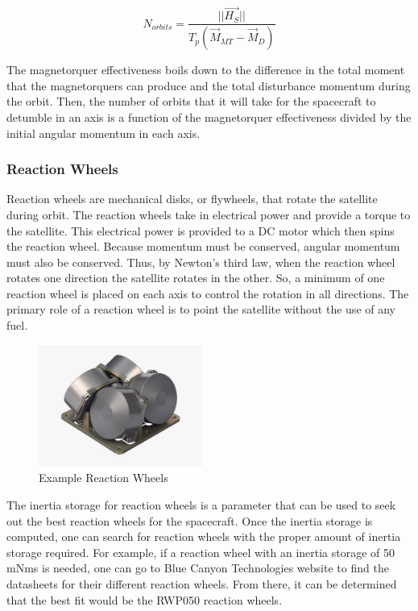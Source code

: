 \begin{equation}
  N_{orbits} = \frac{||\vec{H_S}||}{T_p(\vec{M}_{MT}-\vec{M}_D)}
\end{equation}

The magnetorquer effectiveness boils down to the difference in the
total moment that the magnetorquers can produce and the total
disturbance momentum during the orbit. Then, the number of orbits that
it will take for the spacecraft to detumble in an axis is a function
of the magnetorquer effectiveness divided by the initial angular
momentum in each axis.

\subsubsection{Reaction Wheels}

Reaction wheels are mechanical disks, or flywheels, that rotate the
satellite during orbit. The reaction wheels take in electrical power
and provide a torque to the satellite\cite{qp18}. This electrical power is
provided to a DC motor which then spins the reaction wheel. Because
momentum must be conserved, angular momentum must also be
conserved. Thus, by Newton’s third law, when the reaction wheel
rotates one direction the satellite rotates in the other. So, a
minimum of one reaction wheel is placed on each axis to control the
rotation in all directions. The primary role of a reaction wheel is to
point the satellite without the use of any fuel.
\begin{figure}[H]
  \begin{center}
  \includegraphics[height=40mm]{Figures/ReactionWheels}
  \end{center}
  \caption{Example Reaction Wheels\cite{qp19}}
\end{figure}

The inertia storage for reaction wheels is a parameter that can be
used to seek out the best reaction wheels for the spacecraft. Once the
inertia storage is computed, one can search for reaction wheels with
the proper amount of inertia storage required. For example, if a
reaction wheel with an inertia storage of 50 mNms is needed, one can
go to Blue Canyon Technologies website to find the datasheets for
their different reaction wheels. From there, it can be determined that
the best fit would be the RWP050 reaction wheels\cite{qp20}.

